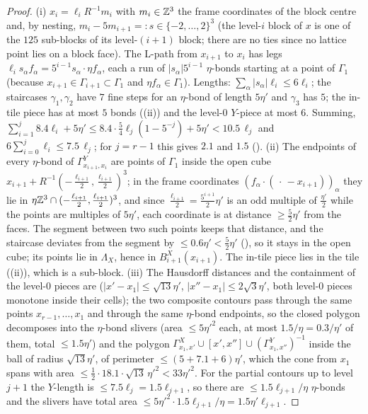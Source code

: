 \begin{proof}
(i) $x_i=\ell_iR^{-1}m_i$ with $m_i\in\mathbb Z^3$ the frame coordinates of the block centre and, by nesting, $m_i-5m_{i+1}=:s\in\{-2,\dots,2\}^3$ (the level-$i$ block of $x$ is one of the $125$ sub-blocks of its level-$(i+1)$ block; there are no ties since no lattice point lies on a block face). The L-path from $x_{i+1}$ to $x_i$ has legs $\ell_is_\alpha f_\alpha=5^{i-1}s_\alpha\cdot\eta f_\alpha$, each a run of $|s_\alpha|5^{i-1}$ $\eta$-bonds starting at a point of $\Gamma_1$ (because $x_{i+1}\in\Gamma_{i+1}\subset\Gamma_1$ and $\eta f_\alpha\in\Gamma_1$). Lengths: $\sum_\alpha|s_\alpha|\ell_i\le6\ell_i$; the staircases $\gamma_1,\gamma_2$ have $7$ fine steps for an $\eta$-bond of length $5\eta'$ and $\gamma_3$ has $5$; the in-tile piece has at most $5$ bonds ((ii)) and the level-$0$ $Y$-piece at most $6$. Summing, $\sum_{i=1}^{j}8.4\ell_i+5\eta'\le8.4\cdot\frac54\ell_j(1-5^{-j})+5\eta'<10.5\,\ell_j$ and $6\sum_{i=0}^{j}\ell_i\le7.5\,\ell_j$; for $j=r-1$ this gives $2.1$ and $1.5$ (). (ii) The endpoints of every $\eta$-bond of $\Gamma^Y_{x_{i+1},x_i}$ are points of $\Gamma_1$ inside the open cube $x_{i+1}+R^{-1}(-\frac{\ell_{i+1}}2,\frac{\ell_{i+1}}2)^3$; in the frame coordinates $(f_\alpha\cdot(\,\cdot\,-x_{i+1}))_\alpha$ they lie in $\eta\mathbb Z^3\cap(-\frac{\ell_{i+1}}2,\frac{\ell_{i+1}}2)^3$, and since $\frac{\ell_{i+1}}2=\frac{5^{i+1}}2\eta'$ is an odd multiple of $\frac{\eta'}2$ while the points are multiples of $5\eta'$, each coordinate is at distance $\ge\frac52\eta'$ from the faces. The segment between two such points keeps that distance, and the staircase deviates from the segment by $\le0.6\eta'<\frac52\eta'$ (), so it stays in the open cube; its points lie in $\Lambda_X$, hence in $B^X_{i+1}(x_{i+1})$. The in-tile piece lies in the tile ((ii)), which is a sub-block. (iii) The Hausdorff distances and the containment of the level-$0$ pieces are  ($|x'-x_1|\le\sqrt{13}\eta'$, $|x''-x_1|\le2\sqrt3\eta'$, both level-$0$ pieces monotone inside their cells); the two composite contours pass through the same points $x_{r-1},\dots,x_1$ and through the same $\eta$-bond endpoints, so the closed polygon decomposes into the $\eta$-bond slivers (area $\le5\eta'^2$ each, at most $1.5/\eta=0.3/\eta'$ of them, total $\le1.5\eta'$) and the polygon $\Gamma^X_{x_1,x'}\cup[x',x'']\cup(\Gamma^Y_{x_1,x''})^{-1}$ inside the ball of radius $\sqrt{13}\eta'$, of perimeter $\le(5+7.1+6)\eta'$, which the cone from $x_1$ spans with area $\le\frac12\cdot18.1\cdot\sqrt{13}\,\eta'^2<33\eta'^2$. For the partial contours up to level $j+1$ the $Y$-length is $\le7.5\ell_j=1.5\ell_{j+1}$, so there are $\le1.5\ell_{j+1}/\eta$ $\eta$-bonds and the slivers have total area $\le5\eta'^2\cdot1.5\ell_{j+1}/\eta=1.5\eta'\ell_{j+1}$.
\end{proof}

